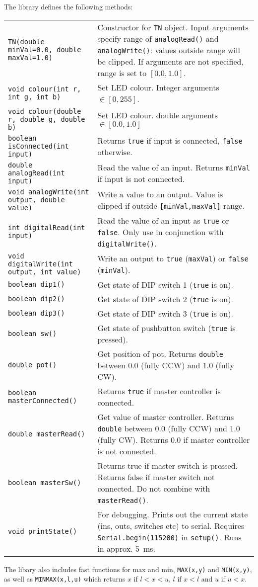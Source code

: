 \documentclass[a4paper,10pt]{article}
\begin{document}
The library defines the following methods:
\begin{table}[h!]
\begin{tabular}{l p{9cm} }
\verb+TN(double minVal=0.0, double maxVal=1.0)+ & Constructor for \verb|TN| object.  Input arguments specify range of \verb|analogRead()| and \verb|analogWrite()|: values outside range will be clipped.  If arguments are not specified, range is set to $[0.0,1.0]$.\\
\verb+void colour(int r, int g, int b)+ & Set LED colour.  Integer arguments $\in [0,255]$.  \\
\verb+void colour(double r, double g, double b)+ & Set LED colour.  double arguments $\in [0.0,1.0]$ \\
\verb+boolean isConnected(int input)+ & Returns \verb|true| if input is connected, \verb|false| otherwise.\\
\verb+double analogRead(int input)+ & Read the value of an input.  Returns \verb|minVal| if input is not connected.\\
\verb+void analogWrite(int output, double value)+ & Write a value to an output.  Value is clipped if outside \verb|[minVal,maxVal]| range.\\
\verb+int digitalRead(int input)+ & Read the value of an input as \verb|true| or \verb|false|.  Only use in conjunction with \verb|digitalWrite()|.\\
\verb+void digitalWrite(int output, int value)+ & Write an output to \verb|true| (\verb|maxVal|) or \verb|false| (\verb|minVal|). \\
\verb+boolean dip1()+ & Get state of DIP switch 1 (\verb|true| is on).\\
\verb+boolean dip2()+ & Get state of DIP switch 2 (\verb|true| is on).\\
\verb+boolean dip3()+ & Get state of DIP switch 3 (\verb|true| is on).\\
\verb+boolean sw()+ & Get state of pushbutton switch (\verb|true| is pressed).\\
\verb+double pot()+ & Get position of pot.  Returns \verb|double| between $0.0$ (fully CCW) and $1.0$ (fully CW).\\
\verb+boolean masterConnected()+ & Returns \verb|true| if master controller is connected.  \\
\verb+double masterRead()+ & Get value of master controller.  Returns \verb|double| between $0.0$ (fully CCW) and $1.0$ (fully CW).  Returns $0.0$ if master controller is not connected. \\
\verb+boolean masterSw()+ & Returns true if master switch is pressed.  Returns false if master switch not connected.  Do not combine with \verb|masterRead()|. \\
\verb+void printState()+ & For debugging.  Prints out the current state (ins, outs, switches etc) to serial.  Requires \verb|Serial.begin(115200)| in \verb|setup()|.  Runs in approx. 5~ms.
\end{tabular}
\end{table}

The libary also includes fast functions for max and min, \verb|MAX(x,y)| and \verb|MIN(x,y)|, as well as \verb|MINMAX(x,l,u)| which returns $x$ if $l<x<u$, $l$ if $x < l$ and $u$ if $u<x$.
\end{document}

